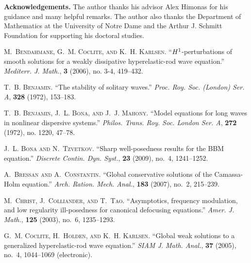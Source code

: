 \documentclass[12pt,reqno]{amsart}
\theoremstyle{plain}  %
\theoremstyle{definition}
\begin{document}
{\bf Acknowledgements.} The author thanks his advisor Alex Himonas for 
his guidance and many helpful remarks. The author also thanks the Department of 
Mathematics at the University of Notre Dame and the Arthur J. Schmitt Foundation for 
supporting his doctoral 
studies.
%
%
%
%
%
%
%
%
%
%
%
\begin{thebibliography}{10}
\newcommand{\enquote}[1]{``#1''}

\textsc{M.~Bendahmane, G.~M. Coclite, and K.~H. Karlsen}.
\newblock \enquote{{$H\sp 1$}-perturbations of smooth solutions for a weakly
  dissipative hyperelastic-rod wave equation.}
\newblock \emph{Mediterr. J. Math.}, \textbf{3} (2006), no. 3-4, 419--432.

\textsc{T.~B. Benjamin}.
\newblock \enquote{The stability of solitary waves.}
\newblock \emph{Proc. Roy. Soc. (London) Ser. A}, \textbf{328} (1972),
  153--183.

\textsc{T.~B. Benjamin, J.~L. Bona, and J.~J. Mahony}.
\newblock \enquote{Model equations for long waves in nonlinear dispersive
  systems.}
\newblock \emph{Philos. Trans. Roy. Soc. London Ser. A}, \textbf{272} (1972),
  no. 1220, 47--78.

\textsc{J.~L. Bona and N.~Tzvetkov}.
\newblock \enquote{Sharp well-posedness results for the {BBM} equation.}
\newblock \emph{Discrete Contin. Dyn. Syst.}, \textbf{23} (2009), no.~4,
  1241--1252.

\textsc{A.~Bressan and A.~Constantin}.
\newblock \enquote{Global conservative solutions of the {C}amassa-{H}olm
  equation.}
\newblock \emph{Arch. Ration. Mech. Anal.}, \textbf{183} (2007), no.~2,
  215--239.

\textsc{M.~Christ, J.~Colliander, and T.~Tao}.
\newblock \enquote{Asymptotics, frequency modulation, and low regularity
  ill-posedness for canonical defocusing equations.}
\newblock \emph{Amer. J. Math.}, \textbf{125} (2003), no.~6, 1235--1293.

\textsc{G.~M. Coclite, H.~Holden, and K.~H. Karlsen}.
\newblock \enquote{Global weak solutions to a generalized hyperelastic-rod wave
  equation.}
\newblock \emph{SIAM J. Math. Anal.}, \textbf{37} (2005), no.~4, 1044--1069
  (electronic).


\end{thebibliography}
\end{document}
